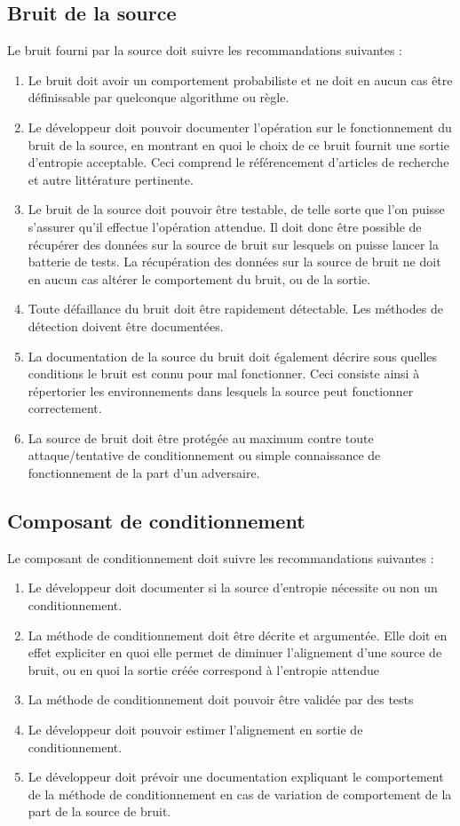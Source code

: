 \subsection{Bruit de la source}
Le bruit fourni par la source doit suivre les recommandations suivantes :
\begin{enumerate}
\item Le bruit doit avoir un comportement probabiliste et ne doit en aucun cas être définissable par quelconque algorithme ou règle.
\item Le développeur doit pouvoir documenter l'opération sur le fonctionnement du bruit de la source, en montrant en quoi le choix de ce bruit fournit une sortie d'entropie acceptable. Ceci comprend le référencement d'articles de recherche et autre littérature pertinente.
\item Le bruit de la source doit pouvoir être testable, de telle sorte que l'on puisse s'assurer qu'il effectue l'opération attendue. Il doit donc être possible de récupérer des données sur la source de bruit sur lesquels on puisse lancer la batterie de tests. La récupération des données sur la source de bruit ne doit en aucun cas altérer le comportement du bruit, ou de la sortie.
\item Toute défaillance du bruit doit être rapidement détectable. Les méthodes de détection doivent être documentées.
\item La documentation de la source du bruit doit également décrire sous quelles conditions le bruit est connu pour mal fonctionner. Ceci consiste ainsi à répertorier les environnements dans lesquels la source peut fonctionner correctement. 
\item La source de bruit doit être protégée au maximum contre toute attaque/tentative de conditionnement ou simple connaissance de fonctionnement de la part d'un adversaire. 
\end{enumerate}

\subsection{Composant de conditionnement}
Le composant de conditionnement doit suivre les recommandations suivantes :
\begin{enumerate}
\item Le développeur doit documenter si la source d'entropie nécessite ou non un conditionnement. 
\item La méthode de conditionnement doit être décrite et argumentée. Elle doit en effet expliciter en quoi elle permet de diminuer l'alignement d'une source de bruit, ou en quoi la sortie créée correspond à l'entropie attendue
\item La méthode de conditionnement doit pouvoir être validée par des tests
\item Le développeur doit pouvoir estimer l'alignement en sortie de conditionnement. 
\item Le développeur doit prévoir une documentation expliquant le comportement de la méthode de conditionnement en cas de variation de comportement de la part de la source de bruit.
\end{enumerate}

